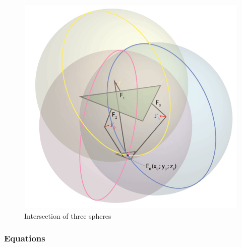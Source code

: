 \begin{figure}[H]
	\centering
	\includegraphics[width=\maxwidth{11cm}, keepaspectratio]{Chapters/Fig/intersection_of_three_spheres.png}
	\caption{Intersection of three spheres}
	\label{fig:intersection_of_three_spheres}
\end{figure}
\subsubsection{Equations}

